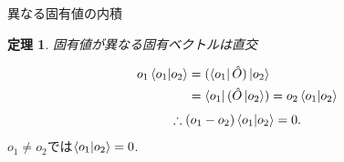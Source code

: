 \documentclass[dvipdfm]{beamer}
\newtheorem*{them}{定理}
\begin{document}

\begin{frame}{異なる固有値の内積}
    \begin{them}
        固有値が異なる固有ベクトルは直交
    \end{them}
    \begin{equation*}
        \begin{split}
            o_1\braket{o_1}{o_2}
            &=
            (\bra{o_1}\hat{O})\ket{o_2}
            \\
            &=
            \bra{o_1}(\hat{O}\ket{o_2})
            =
            o_2\braket{o_1}{o_2}
        \end{split}
    \end{equation*}
    \begin{equation*}
        \therefore
        (o_1-o_2)\braket{o_1}{o_2}=0.
    \end{equation*}
    $o_1\neq o_2$では$\braket{o_1}{o_2}=0$.
\end{frame}
\end{document}
